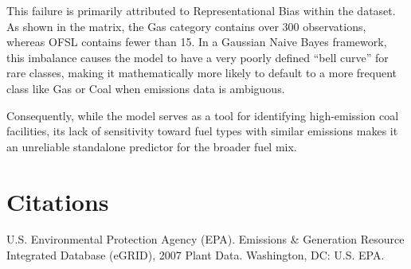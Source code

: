 \documentclass[
]{article}
\begin{document}
This failure is primarily attributed to Representational Bias within the
dataset. As shown in the matrix, the Gas category contains over 300
observations, whereas OFSL contains fewer than 15. In a Gaussian Naive
Bayes framework, this imbalance causes the model to have a very poorly
defined ``bell curve'' for rare classes, making it mathematically more
likely to default to a more frequent class like Gas or Coal when
emissions data is ambiguous.

Consequently, while the model serves as a tool for identifying
high-emission coal facilities, its lack of sensitivity toward fuel types
with similar emissions makes it an unreliable standalone predictor for
the broader fuel mix.

\newpage

\section{Citations}\label{citations}

U.S. Environmental Protection Agency (EPA). Emissions \& Generation
Resource Integrated Database (eGRID), 2007 Plant Data. Washington, DC:
U.S. EPA.
\end{document}
